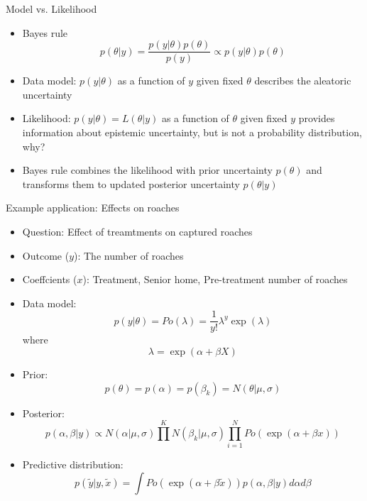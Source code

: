 \documentclass[10pt]{beamer}
\begin{document}
\begin{frame}{Model vs. Likelihood}
  \begin{itemize}
  \item Bayes rule
      \[
      p(\theta|y) = \frac{p(y|\theta)p(\theta)}{p(y)} \propto p(y|\theta)p(\theta)
      \]
    \vspace{\baselineskip}
  \item Data model: $p(y|\theta)$ as a function of $y$ given fixed $\theta$
    describes the {\color{uured} aleatoric} uncertainty \vspace{\baselineskip}
  \item Likelihood: $p(y|\theta)=L(\theta|y)$
    as a function of $\theta$
    given fixed $y$ provides information about epistemic uncertainty,
    but is not a probability distribution, why?
    \vspace{\baselineskip}
  \item<2-> Bayes rule combines the likelihood with prior uncertainty
    $p(\theta)$ and transforms them to updated posterior uncertainty $p(\theta|y)$
  \end{itemize}
\end{frame}



\begin{frame}{Example application: Effects on roaches}
\begin{itemize}
\item Question: Effect of treamtments on captured roaches
\pause
\item Outcome ($y$): The number of roaches
\item Coeffcients ($x$): Treatment, Senior home, Pre-treatment number of roaches
\pause
\item Data model:
\[
p(y|\theta) = Po(\lambda) = \frac{1}{y!}\lambda^y \exp(\lambda)
\]
where
\[
\lambda = \exp(\alpha + \beta X)
\]
\item Prior:
\[
p(\theta) = p(\alpha) = p(\beta_k) = N(\theta|\mu,\sigma)
\]
\pause
\item Posterior:
\[
p(\alpha, \beta|y) \propto N(\alpha|\mu,\sigma) \prod^K N(\beta_k|\mu,\sigma) \prod^N_{i=1} Po(\exp(\alpha + \beta x))
\]
\pause
\item Predictive distribution:
\[
p(\tilde{y}|y,\tilde{x}) = \int Po(\exp(\alpha + \beta \tilde{x})) p(\alpha, \beta |y) d\alpha d\beta
\]

\end{itemize}

\end{frame}
\end{document}

